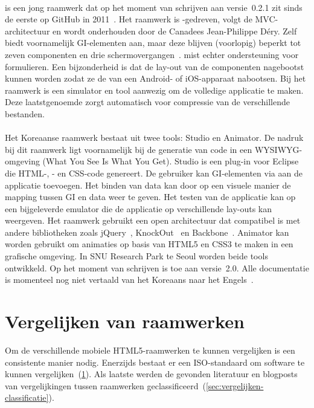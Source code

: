 \paragraph{\moobile} %
\moobile{} is een jong raamwerk dat op het moment van schrijven aan versie~0.2.1 zit sinds de eerste  op GitHub in 2011~\cite{Dery2013}.
Het raamwerk is \js{}-gedreven, volgt de MVC-architectuur en wordt onderhouden door de Canadees Jean-Philippe Déry.
Zelf biedt \moobile{} voornamelijk GI-elementen aan, maar deze blijven (voorlopig) beperkt tot zeven componenten en drie schermovergangen~\cite{Dery2013}.
\moobile{} mist echter ondersteuning voor formulieren.
Een bijzonderheid is dat de lay-out van de componenten nagebootst kunnen worden zodat ze de  van een Android- of iOS-apparaat nabootsen.
Bij het raamwerk is een simulator en tool aanwezig om de volledige applicatie te maken.
Deze laatstgenoemde zorgt automatisch voor compressie van de verschillende bestanden.

\paragraph{\davinci}%
Het Koreaanse raamwerk \davinci{} bestaat uit twee tools:  \davinci{} Studio en \davinci{} Animator.
De nadruk bij dit raamwerk ligt voornamelijk bij de generatie van code in een WYSIWYG-omgeving (What You See Is What You Get).
\davinci{} Studio is een plug-in voor Eclipse die HTML-,  \js{}- en CSS-code genereert.
De gebruiker kan GI-elementen via  aan de applicatie toevoegen.
Het binden van data kan door op een visuele manier de mapping tussen GI en data weer te geven.
Het testen van de applicatie kan op een bijgeleverde emulator die de applicatie op verschillende lay-outs kan weergeven.
Het raamwerk gebruikt een open architectuur dat compatibel is met andere  bibliotheken zoals jQuery~\cite{JQuery2013a}, KnockOut~\cite{KnockOut2013} en Backbone~\cite{Backbone2013}.
\davinci{} Animator kan worden gebruikt om animaties op basis van HTML5 en CSS3 te maken in een grafische omgeving.
In SNU Research Park te Seoul worden beide tools ontwikkeld.
Op het moment van schrijven is \davinci{} toe aan versie~2.0.  
Alle documentatie is momenteel nog niet vertaald van het Koreaans naar het Engels~\cite{Incross}.

 

\section{Vergelijken van raamwerken} 
\label{sec:vergelijken-raamwerken}
Om de verschillende mobiele HTML5-raamwerken te kunnen vergelijken is een consistente manier nodig.
Enerzijds bestaat er een ISO-standaard om software te kunnen vergelijken~(\ref{sec:vergelijken-raamwerken}).
Als laatste werden de gevonden literatuur en blogposts van vergelijkingen tussen raamwerken geclassificeerd~(\ref{sec:vergelijken-classificatie}).

